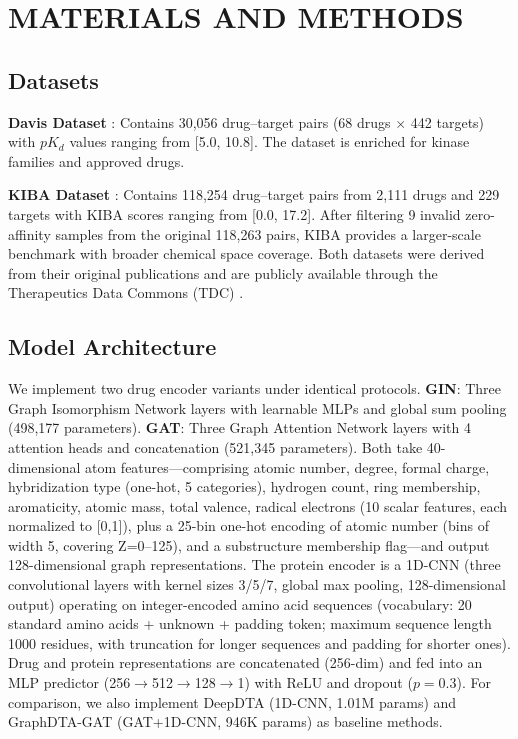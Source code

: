 \documentclass[10pt,a4paper,twocolumn]{article}
\begin{document}
\section{MATERIALS AND METHODS}

\subsection{Datasets}

\textbf{Davis Dataset} \cite{davis2011predicting}: Contains 30,056 drug--target pairs (68 drugs $\times$ 442 targets) with $pK_d$ values ranging from [5.0, 10.8]. The dataset is enriched for kinase families and approved drugs.

\textbf{KIBA Dataset} \cite{tang2014kiba}: Contains 118,254 drug--target pairs from 2,111 drugs and 229 targets with KIBA scores ranging from [0.0, 17.2]. After filtering 9 invalid zero-affinity samples from the original 118,263 pairs, KIBA provides a larger-scale benchmark with broader chemical space coverage. Both datasets were derived from their original publications \cite{davis2011predicting,tang2014kiba} and are publicly available through the Therapeutics Data Commons (TDC) \cite{huang2021tdc}.

\subsection{Model Architecture}

We implement two drug encoder variants under identical protocols. \textbf{GIN}: Three Graph Isomorphism Network layers \cite{xu2019powerful} with learnable MLPs and global sum pooling (498,177 parameters). \textbf{GAT}: Three Graph Attention Network layers \cite{velickovic2018gat} with 4 attention heads and concatenation (521,345 parameters). Both take 40-dimensional atom features---comprising atomic number, degree, formal charge, hybridization type (one-hot, 5 categories), hydrogen count, ring membership, aromaticity, atomic mass, total valence, radical electrons (10 scalar features, each normalized to [0,1]), plus a 25-bin one-hot encoding of atomic number (bins of width 5, covering Z=0--125), and a substructure membership flag---and output 128-dimensional graph representations. The protein encoder is a 1D-CNN (three convolutional layers with kernel sizes 3/5/7, global max pooling, 128-dimensional output) operating on integer-encoded amino acid sequences (vocabulary: 20 standard amino acids + unknown + padding token; maximum sequence length 1000 residues, with truncation for longer sequences and padding for shorter ones). Drug and protein representations are concatenated (256-dim) and fed into an MLP predictor (256$\to$512$\to$128$\to$1) with ReLU and dropout ($p=0.3$). For comparison, we also implement DeepDTA \cite{ozturk2018deepdta} (1D-CNN, 1.01M params) and GraphDTA-GAT \cite{nguyen2021graphdta} (GAT+1D-CNN, 946K params) as baseline methods.
\end{document}
